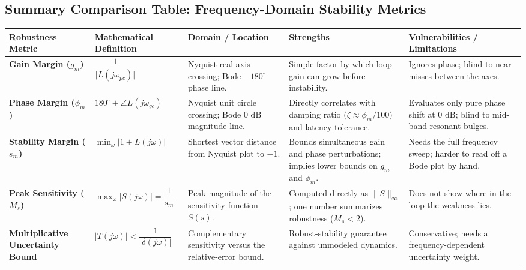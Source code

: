 \documentclass[12pt,onecolumn,twoside ]{article}
\begin{document}
	\subsection{Summary Comparison Table: Frequency-Domain Stability Metrics}
	\begin{center}\small\begin{tabularx}{\textwidth}{*{5}{Y}}
			\toprule
			\textbf{Robustness Metric} & \textbf{Mathematical Definition} & \textbf{Domain / Location} & \textbf{Strengths} & \textbf{Vulnerabilities / Limitations} \\
			\midrule
			\textbf{Gain Margin ($g_m$)} & $\dfrac{1}{\lvert L(j\omega_{pc})\rvert}$ & Nyquist real-axis crossing; Bode $-180^\circ$ phase line. & Simple factor by which loop gain can grow before instability. & Ignores phase; blind to near-misses between the axes. \\
			\textbf{Phase Margin ($\phi_m$)} & $180^\circ + \angle L(j\omega_{gc})$ & Nyquist unit circle crossing; Bode $0\text{ dB}$ magnitude line. & Directly correlates with damping ratio ($\zeta \approx \phi_m / 100$) and latency tolerance. & Evaluates only pure phase shift at $0\text{ dB}$; blind to mid-band resonant bulges. \\
			\textbf{Stability Margin ($s_m$)} & $\min_\omega \lvert 1 + L(j\omega)\rvert$ & Shortest vector distance from Nyquist plot to $-1$. & Bounds simultaneous gain and phase perturbations; implies lower bounds on $g_m$ and $\phi_m$. & Needs the full frequency sweep; harder to read off a Bode plot by hand. \\
			\textbf{Peak Sensitivity ($M_s$)} & $\max_\omega \lvert S(j\omega)\rvert = \dfrac{1}{s_m}$ & Peak magnitude of the sensitivity function $S(s)$. & Computed directly as $\lVert S\rVert_\infty$; one number summarizes robustness ($M_s < 2$). & Does not show where in the loop the weakness lies. \\
			\textbf{Multiplicative Uncertainty Bound} & $\lvert T(j\omega)\rvert < \dfrac{1}{\lvert\delta(j\omega)\rvert}$ & Complementary sensitivity versus the relative-error bound. & Robust-stability guarantee against unmodeled dynamics. & Conservative; needs a frequency-dependent uncertainty weight. \\
			\bottomrule
	\end{tabularx}\end{center}
	
\end{document}
